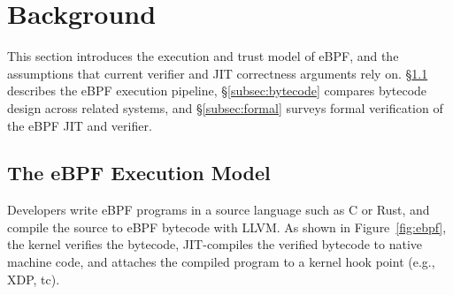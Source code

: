 






\section{Background}
\label{sec:background}

This section introduces the execution and trust model of eBPF, and the assumptions that current verifier and JIT correctness arguments rely on.
%
\S\ref{subsec:ebpf} describes the eBPF execution pipeline, \S\ref{subsec:bytecode} compares bytecode design across related systems, and \S\ref{subsec:formal} surveys formal verification of the eBPF JIT and verifier.

\subsection{The eBPF Execution Model}
\label{subsec:ebpf}

Developers write eBPF programs in a source language such as C or Rust, and compile the source to eBPF bytecode with LLVM. As shown in Figure~\ref{fig:ebpf}, the kernel verifies the bytecode, JIT-compiles the verified bytecode to native machine code, and attaches the compiled program to a kernel hook point (e.g., XDP, tc).

